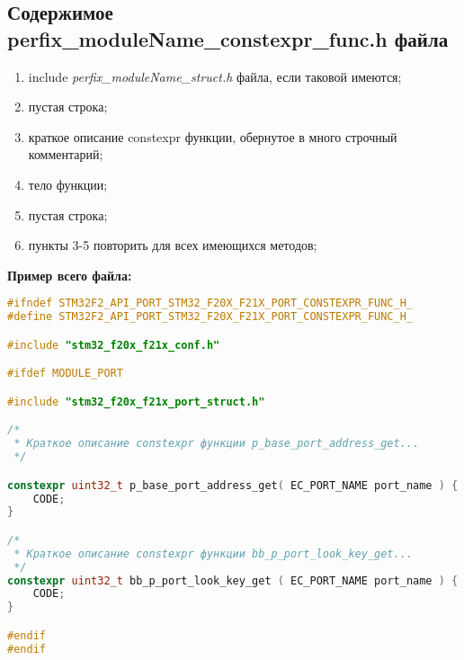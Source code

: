 \subsection{Содержимое perfix\-\_module\-Name\-\_const\-expr\-\_func.h файла}\label{p:conf:h}
\begin{enumerate}
	\item include \textit{perfix\-\_moduleName\-\_struct.h} файла, если таковой имеются;
	\item пустая строка;
	\item краткое описание constexpr функции, обернутое в много строчный комментарий;
	\item тело функции;
	\item пустая строка;
	\item пункты 3-5 повторить для всех имеющихся методов;
\end{enumerate}
\textbf{Пример всего файла:}\begin{lstlisting}[language=C++, frame=tlBR, basicstyle=\fontsize{10}{10}\ttfamily]
#ifndef STM32F2_API_PORT_STM32_F20X_F21X_PORT_CONSTEXPR_FUNC_H_
#define STM32F2_API_PORT_STM32_F20X_F21X_PORT_CONSTEXPR_FUNC_H_

#include "stm32_f20x_f21x_conf.h"

#ifdef MODULE_PORT

#include "stm32_f20x_f21x_port_struct.h"

/*
 * Краткое описание constexpr функции p_base_port_address_get...
 */

constexpr uint32_t p_base_port_address_get( EC_PORT_NAME port_name ) {
	CODE;
}

/*
 * Краткое описание constexpr функции bb_p_port_look_key_get...
 */
constexpr uint32_t bb_p_port_look_key_get ( EC_PORT_NAME port_name ) {
	CODE;
}

#endif
#endif
 \end{lstlisting}

